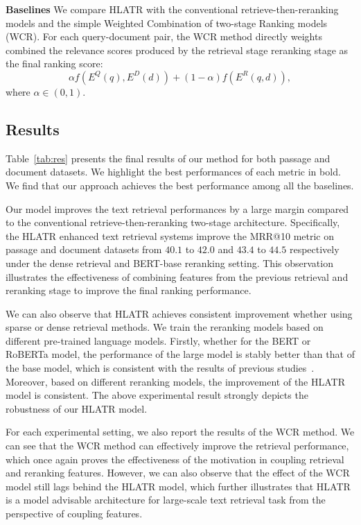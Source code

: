 \documentclass[11pt]{article}
\begin{document}
\vspace{0.15cm}
\noindent \textbf{Baselines} We compare HLATR with the conventional retrieve-then-reranking models and the simple Weighted Combination of two-stage Ranking models (WCR). For each query-document pair, the WCR method directly weights combined the relevance scores produced by the retrieval stage reranking stage as the final ranking score:
\begin{equation}
\alpha f(E^Q(q), E^D(d)) + (1-\alpha)f(E^R(q,d)),
\end{equation}
where $\alpha \in (0,1)$.


\subsection{Results}
Table~\ref{tab:res} presents the final results of our method for both passage and document datasets. We highlight the best performances of each metric in bold. We find that our approach achieves the best performance among all the baselines.

Our model improves the text retrieval performances by a large margin compared to the conventional retrieve-then-reranking two-stage architecture. Specifically, the HLATR enhanced text retrieval systems improve the MRR@10 metric on passage and document datasets from $40.1$ to $42.0$ and $43.4$ to $44.5$ respectively under the dense retrieval and BERT-base reranking setting. This observation illustrates the effectiveness of combining features from the previous retrieval and reranking stage to improve the final ranking performance.

We can also observe that HLATR achieves consistent improvement whether using sparse or dense retrieval methods. We train the reranking models based on different pre-trained language models. Firstly, whether for the BERT or RoBERTa model, the performance of the large model is stably better than that of the base model, which is consistent with the results of previous studies~\cite{gao2021rethink,ma2021b}. Moreover, based on different reranking models, the improvement of the HLATR model is consistent. The above experimental result strongly depicts the robustness of our HLATR model. 

For each experimental setting, we also report the results of the WCR method. We can see that the WCR method can effectively improve the retrieval performance, which once again proves the effectiveness of the motivation in coupling retrieval and reranking features. However, we can also observe that the effect of the WCR model still lags behind the HLATR model, which further illustrates that HLATR is a model advisable architecture for large-scale text retrieval task from the perspective of coupling features.
\end{document}
